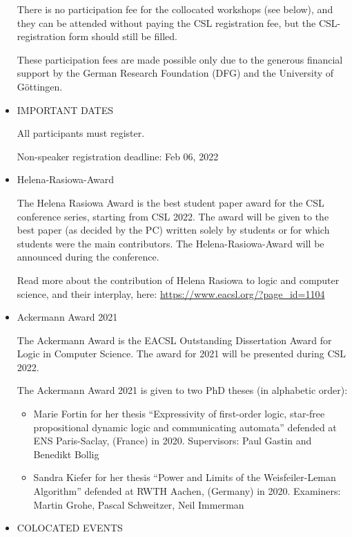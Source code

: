 \documentclass[prodmode,acmtecs]{acmsmall} %
\begin{document}
\begin{itemize}
  There is no participation fee for the collocated workshops (see below), and they can be attended without paying the CSL registration fee, but the CSL-registration form should still be filled. 
 
  These participation fees are made possible only due to the generous financial support by the German Research Foundation (DFG) and the University of Göttingen. 
 
\item  IMPORTANT DATES 
 
  All participants must register. 
 
Non-speaker registration deadline: Feb 06, 2022 
 
\item  Helena-Rasiowa-Award 
 
  The Helena Rasiowa Award is the best student paper award for the CSL conference series, starting from CSL 2022. The award will be given to the best paper (as decided by the PC) written solely by students or for which students were the main contributors. The Helena-Rasiowa-Award will be announced during the conference. 
 
  Read more about the contribution of Helena Rasiowa to logic and computer science, and their interplay, here: \href{https://www.eacsl.org/?page_id=1104}{https://www.eacsl.org/?page\_id=1104} 
 
\item  Ackermann Award 2021 
 
  The Ackermann Award is the EACSL Outstanding Dissertation Award for Logic in Computer Science. The award for 2021 will be presented during CSL 2022. 
 
  The Ackermann Award 2021 is given to two PhD theses (in alphabetic order): 
 
\begin{itemize}\item  Marie Fortin for her thesis ``Expressivity of first-order logic, star-free propositional dynamic logic and communicating automata'' defended at ENS Paris-Saclay, (France) in 2020. Supervisors: Paul Gastin and Benedikt Bollig
\item  Sandra Kiefer for her thesis ``Power and Limits of the Weisfeiler-Leman Algorithm'' defended at RWTH Aachen, (Germany) in 2020. Examiners: Martin Grohe, Pascal Schweitzer, Neil Immerman
\end{itemize} 
\item  COLOCATED EVENTS 
 

\end{itemize}
\end{document}
